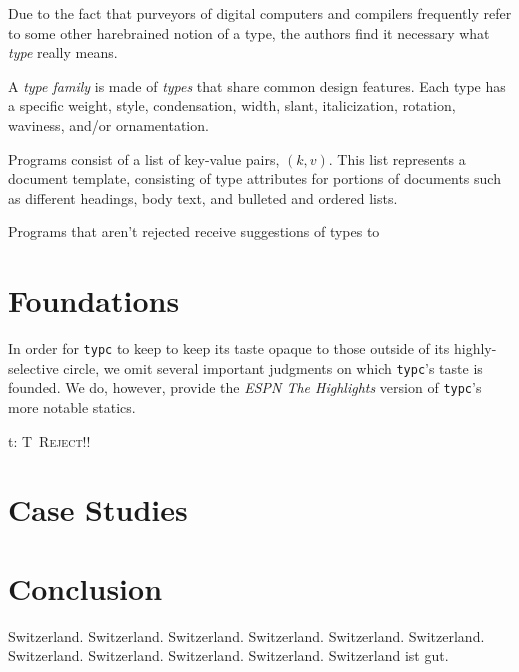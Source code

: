 \documentclass{acm_proc_article-sp}
\begin{document}
Due to the fact that purveyors of digital computers and compilers frequently
refer to some other harebrained notion of a type, the authors find it
necessary what {\em type} really means.

A {\em type family} is made of {\em types} that share common design features.
Each type has a specific weight, style, condensation, width, slant,
italicization, rotation, waviness, and/or ornamentation.

Programs consist of a list of key-value pairs, $(k, v)$. This list represents
a document template, consisting of type attributes for portions of documents
such as different headings, body text, and bulleted and ordered lists.

Programs that aren't rejected receive suggestions of types to


\section{Foundations}

In order for \texttt{typc} to keep to keep its taste opaque to those outside
of its highly-selective circle, we omit several important judgments on which
\texttt{typc}'s taste is founded. We do, however, provide the {\em ESPN The
Highlights} version of \texttt{typc}'s more notable statics.

{ \Gamma \vdash t: T~\textsc{Reject!!}
}


\section{Case Studies}

\section{Conclusion}
Switzerland. Switzerland. Switzerland. Switzerland. Switzerland. Switzerland. Switzerland. Switzerland. Switzerland. Switzerland. Switzerland ist gut.


\end{document}
